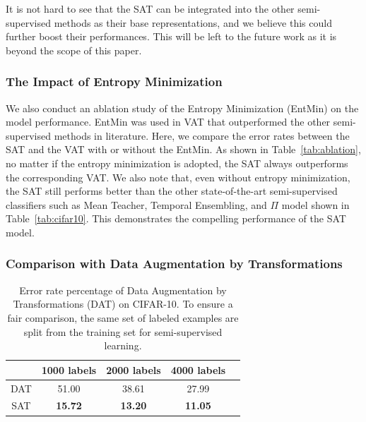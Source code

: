 \documentclass[10pt,journal,compsoc,twoside]{IEEEtran}
\begin{document}
It is not hard to see that the SAT can be integrated into the other semi-supervised methods as their base representations, and we believe this could further boost their performances. This will be left to the future work as it is beyond the scope of this paper.



\subsubsection{The Impact of Entropy Minimization}

We also conduct an ablation study of the Entropy Minimization (EntMin) on the model performance. EntMin was used in VAT \cite{miyato2018virtual} that outperformed the other semi-supervised methods in literature. Here, we compare the error rates between the SAT and the VAT with or without the EntMin.
As shown in Table~\ref{tab:ablation}, no matter if the entropy minimization is adopted, the SAT always outperforms the corresponding VAT. We also note that, even without entropy minimization, the SAT still performs better than the other state-of-the-art semi-supervised classifiers such as Mean Teacher, Temporal Ensembling, and $\Pi$ model shown in Table~\ref{tab:cifar10}. This demonstrates the compelling performance of the SAT model.

\subsubsection{Comparison with Data Augmentation by Transformations}

\begin{table}
\caption{Error rate percentage of Data Augmentation by Transformations (DAT) on CIFAR-10. To ensure a fair comparison, the same set of labeled examples are split from the training set for semi-supervised learning.}\label{tab:da}
\vspace{2mm}\centering
 \begin{tabular}{ccccc} \toprule
   &1000 labels&2000 labels&4000 labels\\ \midrule
DAT&51.00&38.61&27.99\\
SAT&\textbf{15.72}&\textbf{13.20}&\textbf{11.05}\\\bottomrule
\end{tabular}
\vspace{-10pt}
\end{table}
\end{document}
